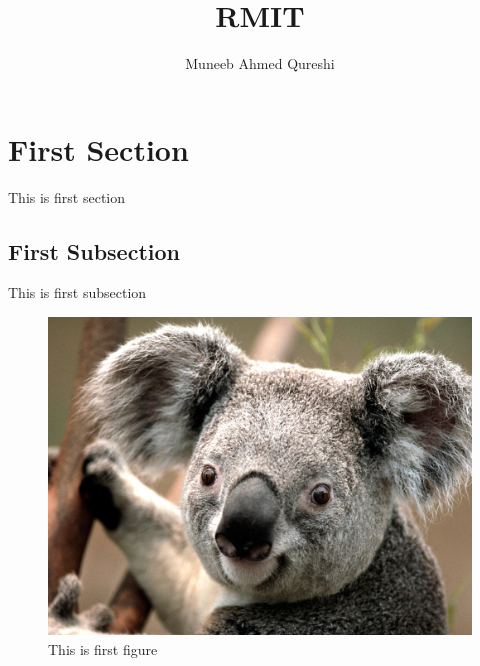 \documentclass{article}
\begin{document}
\title{RMIT}
\author{Muneeb Ahmed Qureshi}
\maketitle
\section{First Section}
This is first section
\subsection{First Subsection}
This is first subsection
\begin{figure}[h]
	\includegraphics[width=\linewidth]{koala}
	\caption{This is first figure}
\end{figure}
\end{document}

